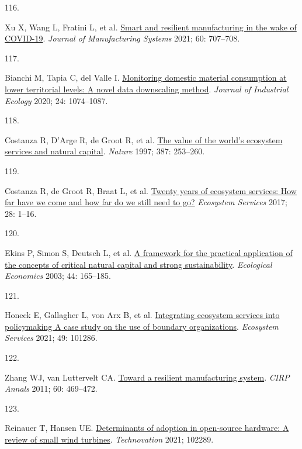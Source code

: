 \documentclass[
  12pt,
  a4paperpaper,
  onecolumn]{article}
\newlength{\cslhangindent}
\newlength{\csllabelwidth}
\newlength{\cslentryspacingunit} %
\newenvironment{CSLReferences}[2] %
 {%
  \setlength{\parindent}{0pt}
  \ifodd #1
  \let\oldpar\par
  \def\par{\hangindent=\cslhangindent\oldpar}
  \fi
  \setlength{\parskip}{#2\cslentryspacingunit}
 }%
 {}
\newcommand{\CSLLeftMargin}[1]{\parbox[t]{\csllabelwidth}{#1}}
\newcommand{\CSLRightInline}[1]{\parbox[t]{\linewidth - \csllabelwidth}{#1}\break}
\begin{document}
\begin{CSLReferences}{0}{0}
\leavevmode{}%
\CSLLeftMargin{116. }%
\CSLRightInline{Xu X, Wang L, Fratini L, et al.
\href{https://doi.org/10.1016/j.jmsy.2021.07.025}{Smart and resilient
manufacturing in the wake of {COVID-19}}. \emph{Journal of Manufacturing
Systems} 2021; 60: 707--708.}

\leavevmode{}%
\CSLLeftMargin{117. }%
\CSLRightInline{Bianchi M, Tapia C, del Valle I.
\href{https://doi.org/10.1111/jiec.13000}{Monitoring domestic material
consumption at lower territorial levels: {A} novel data downscaling
method}. \emph{Journal of Industrial Ecology} 2020; 24: 1074--1087.}

\leavevmode{}%
\CSLLeftMargin{118. }%
\CSLRightInline{Costanza R, D'Arge R, de Groot R, et al.
\href{https://doi.org/10.1038/387253a0}{The value of the world's
ecosystem services and natural capital}. \emph{Nature} 1997; 387:
253--260.}

\leavevmode{}%
\CSLLeftMargin{119. }%
\CSLRightInline{Costanza R, de Groot R, Braat L, et al.
\href{https://doi.org/10.1016/j.ecoser.2017.09.008}{Twenty years of
ecosystem services: {How} far have we come and how far do we still need
to go?} \emph{Ecosystem Services} 2017; 28: 1--16.}

\leavevmode{}%
\CSLLeftMargin{120. }%
\CSLRightInline{Ekins P, Simon S, Deutsch L, et al.
\href{https://doi.org/10.1016/S0921-8009(02)00272-0}{A framework for the
practical application of the concepts of critical natural capital and
strong sustainability}. \emph{Ecological Economics} 2003; 44: 165--185.}

\leavevmode{}%
\CSLLeftMargin{121. }%
\CSLRightInline{Honeck E, Gallagher L, von Arx B, et al.
\href{https://doi.org/10.1016/j.ecoser.2021.101286}{Integrating
ecosystem services into policymaking \textendash{} {A} case study on the
use of boundary organizations}. \emph{Ecosystem Services} 2021; 49:
101286.}

\leavevmode{}%
\CSLLeftMargin{122. }%
\CSLRightInline{Zhang WJ, van Luttervelt CA.
\href{https://doi.org/10.1016/j.cirp.2011.03.041}{Toward a resilient
manufacturing system}. \emph{CIRP Annals} 2011; 60: 469--472.}

\leavevmode{}%
\CSLLeftMargin{123. }%
\CSLRightInline{Reinauer T, Hansen UE.
\href{https://doi.org/10.1016/j.technovation.2021.102289}{Determinants
of adoption in open-source hardware: {A} review of small wind turbines}.
\emph{Technovation} 2021; 102289.}


\end{CSLReferences}
\end{document}
